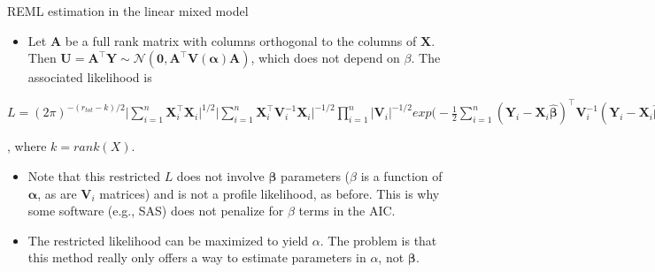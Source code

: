 \documentclass[
  9pt,
  ignorenonframetext,
]{beamer}
\providecommand{\tightlist}{%
  \setlength{\itemsep}{0pt}\setlength{\parskip}{0pt}}
\begin{document}
\begin{frame}{REML estimation in the linear mixed model}
\protect\hypertarget{reml-estimation-in-the-linear-mixed-model}{}
\begin{itemize}
\tightlist
\item
  Let \(\pmb A\) be a full rank matrix with columns orthogonal to the
  columns of \(\pmb X\). Then
  \(\pmb U= \pmb {A^{\top} Y} \sim \mathcal N(\pmb 0, \pmb{A^{\top} V(\alpha)A})\),
  which does not depend on \(\beta\). The associated likelihood is
\end{itemize}

\tiny

\(L=(2\pi)^{-(r_{tot}-k)/2} \Big|\sum_{i=1}^n \pmb X_i^{\top} \pmb X_i \Big|^ {1/2} \Big|\sum_{i=1}^n \pmb X_i^{\top} \pmb V_i^{-1} \pmb X_i \Big|^{-1/2} \prod_{i=1}^n |\pmb V_i |^{-1/2} exp \Big(-\frac 1 2 \sum_{i=1}^n (\pmb Y_i-\pmb X_i \pmb{\hat \beta})^{\top} \pmb V_i^{-1} (\pmb Y_i - \pmb X_i \pmb {\hat\beta})\Big)\)

\normalsize

, where \(k=rank(X)\).

\begin{itemize}
\item
  Note that this restricted \(L\) does not involve \(\pmb \beta\)
  parameters (\(\hat \beta\) is a function of \(\pmb \alpha\), as are
  \(\pmb V_i\) matrices) and is not a profile likelihood, as before.
  This is why some software (e.g., SAS) does not penalize for \(\beta\)
  terms in the AIC.
\item
  The restricted likelihood can be maximized to yield \(\alpha\). The
  problem is that this method really only offers a way to estimate
  parameters in \(\alpha\), not \(\pmb \beta\).
\end{itemize}
\end{frame}
\end{document}
